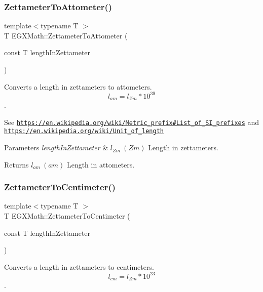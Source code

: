 \subsubsection{\texorpdfstring{Zettameter\+To\+Attometer()}{ZettameterToAttometer()}}
{\footnotesize\ttfamily template$<$typename T $>$ \\
T E\+G\+X\+Math\+::\+Zettameter\+To\+Attometer (\begin{DoxyParamCaption}\item[{const T}]{length\+In\+Zettameter }\end{DoxyParamCaption})}



Converts a length in zettameters to attometers. \[ l_{am}=l_{Zm} * 10^{39} \]. 

See \href{https://en.wikipedia.org/wiki/Metric_prefix#List_of_SI_prefixes}{\tt https\+://en.\+wikipedia.\+org/wiki/\+Metric\+\_\+prefix\#\+List\+\_\+of\+\_\+\+S\+I\+\_\+prefixes} and \href{https://en.wikipedia.org/wiki/Unit_of_length}{\tt https\+://en.\+wikipedia.\+org/wiki/\+Unit\+\_\+of\+\_\+length} 
\begin{DoxyParams}{Parameters}
{\em length\+In\+Zettameter} & $ l_{Zm}\ (Zm)$ Length in zettameters. \\
\hline
\end{DoxyParams}
\begin{DoxyReturn}{Returns}
$ l_{am}\ (am)$ Length in attometers. 
\end{DoxyReturn}
\mbox{\label{group___e_g_x_math-_conversions-_length_conversions-_s_i-_zettameter-_s_i_gae555780970b9583ec04265ea8e422e7c}} 
\subsubsection{\texorpdfstring{Zettameter\+To\+Centimeter()}{ZettameterToCentimeter()}}
{\footnotesize\ttfamily template$<$typename T $>$ \\
T E\+G\+X\+Math\+::\+Zettameter\+To\+Centimeter (\begin{DoxyParamCaption}\item[{const T}]{length\+In\+Zettameter }\end{DoxyParamCaption})}



Converts a length in zettameters to centimeters. \[ l_{cm}=l_{Zm} * 10^{23} \]. 

